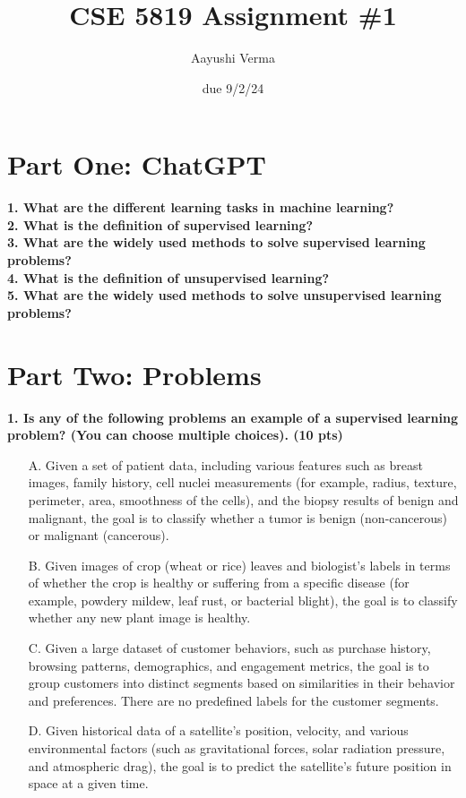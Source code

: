 \documentclass{article}
\title{CSE 5819 Assignment \#1}
\author{Aayushi Verma}
\date{due 9/2/24}
\begin{document}
\maketitle

\section{Part One: ChatGPT}
\textbf{1. What are the different learning tasks in machine learning?}\\

\textbf{2. What is the definition of supervised learning?}\\

\textbf{3. What are the widely used methods to solve supervised learning problems?}\\

\textbf{4. What is the definition of unsupervised learning?}\\

\textbf{5. What are the widely used methods to solve unsupervised learning problems?}\\

\section{Part Two: Problems}

\textbf{1. Is any of the following problems an example of a supervised learning problem? (You can choose multiple choices). (10 pts)}

\begin{itemize}
    \item[A.] Given a set of patient data, including various features such as breast images, family history, cell nuclei measurements (for example, radius, texture, perimeter, area, smoothness of the cells), and the biopsy results of benign and malignant, the goal is to classify whether a tumor is benign (non-cancerous) or malignant (cancerous).
    \item[B.] Given images of crop (wheat or rice) leaves and biologist’s labels in terms of whether the crop is healthy or suffering from a specific disease (for example, powdery mildew, leaf rust, or bacterial blight), the goal is to classify whether any new plant image is healthy.
    \item[C.] Given a large dataset of customer behaviors, such as purchase history, browsing patterns, demographics, and engagement metrics, the goal is to group customers into distinct segments based on similarities in their behavior and preferences. There are no predefined labels for the customer segments.
    \item[D.] Given historical data of a satellite's position, velocity, and various environmental factors (such as gravitational forces, solar radiation pressure, and atmospheric drag), the goal is to predict the satellite's future position in space at a given time.
\end{itemize}
\end{document}
